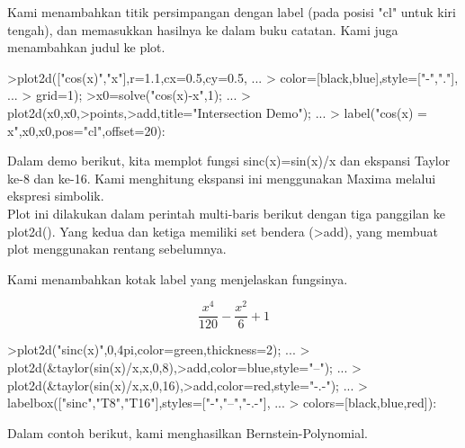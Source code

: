 \documentclass[a4paper,10pt]{article}
\begin{document}
\begin{eulernotebook}
\begin{eulercomment}
\begin{eulercomment}
\begin{eulercomment}
\begin{eulercomment}
\begin{eulercomment}
\begin{eulercomment}
\begin{eulercomment}
\begin{eulercomment}
\begin{eulercomment}
\begin{eulercomment}
\begin{eulercomment}
\begin{eulercomment}
\begin{eulercomment}
\begin{eulercomment}
\begin{eulerprompt}
\end{eulerprompt}
\begin{eulercomment}
Kami menambahkan titik persimpangan dengan label (pada posisi "cl"
untuk kiri tengah), dan memasukkan hasilnya ke dalam buku catatan.
Kami juga menambahkan judul ke plot.
\end{eulercomment}
\begin{eulerprompt}
>plot2d(["cos(x)","x"],r=1.1,cx=0.5,cy=0.5, ...
>  color=[black,blue],style=["-","."], ...
>  grid=1);
>x0=solve("cos(x)-x",1);  ...
>  plot2d(x0,x0,>points,>add,title="Intersection Demo");  ...
>  label("cos(x) = x",x0,x0,pos="cl",offset=20):
\end{eulerprompt}
\begin{eulercomment}
Dalam demo berikut, kita memplot fungsi sinc(x)=sin(x)/x dan ekspansi
Taylor ke-8 dan ke-16. Kami menghitung ekspansi ini menggunakan Maxima
melalui ekspresi simbolik.\\
Plot ini dilakukan dalam perintah multi-baris berikut dengan tiga
panggilan ke plot2d(). Yang kedua dan ketiga memiliki set bendera
(\textgreater{}add), yang membuat plot menggunakan rentang sebelumnya.

Kami menambahkan kotak label yang menjelaskan fungsinya.
\end{eulercomment}
\begin{eulerformula}
\[
\frac{x^4}{120}-\frac{x^2}{6}+1
\]
\end{eulerformula}
\begin{eulerprompt}
>plot2d("sinc(x)",0,4pi,color=green,thickness=2); ...
>  plot2d(&taylor(sin(x)/x,x,0,8),>add,color=blue,style="--"); ...
>  plot2d(&taylor(sin(x)/x,x,0,16),>add,color=red,style="-.-"); ...
>  labelbox(["sinc","T8","T16"],styles=["-","--","-.-"], ...
>    colors=[black,blue,red]):
\end{eulerprompt}
\begin{eulercomment}
Dalam contoh berikut, kami menghasilkan Bernstein-Polynomial.


\end{eulercomment}
\end{eulercomment}
\end{eulercomment}
\end{eulercomment}
\end{eulercomment}
\end{eulercomment}
\end{eulercomment}
\end{eulercomment}
\end{eulercomment}
\end{eulercomment}
\end{eulercomment}
\end{eulercomment}
\end{eulercomment}
\end{eulercomment}
\end{eulercomment}
\end{eulernotebook}
\end{document}
